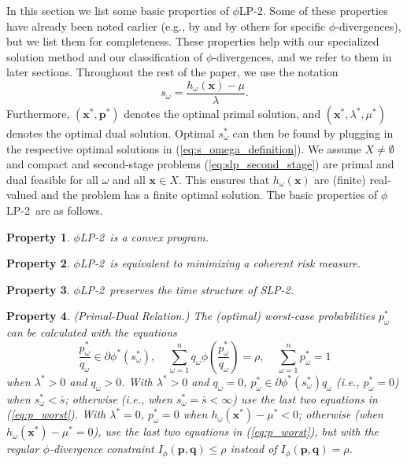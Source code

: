 \documentclass[opre,nonblindrev]{informs3} %
\newcommand{\x}{\mathbf{x}}
\newcommand{\q}{\mathbf{q}}
\newcommand{\p}{\mathbf{p}}
\newtheorem{property}{Property}
\newcommand{\plp}{$\phi$LP-2}
\begin{document}
In this section we list some basic properties of \plp.
Some of these properties have already been noted earlier (e.g., by \citet{bental2013robust} and by others for specific $\phi$-divergences), but we list them for completeness.
These properties help with our specialized solution method and our classification of $\phi$-divergences, and we refer to them in later sections.
Throughout the rest of the paper, we use the notation
\begin{equation}
	s_\omega = \frac{h_\omega(\x) - \mu}{\lambda}. \label{eq:s_omega_definition}
\end{equation}
Furthermore, $(\x^*, \p^*)$ denotes the optimal primal solution, and $(\x^*, \lambda^*, \mu^*)$ denotes the optimal dual solution.
Optimal $s_\omega^*$ can then be found by plugging in the respective optimal solutions in (\ref{eq:s_omega_definition}). 
We assume $X \neq \emptyset$ and compact and second-stage problems (\ref{eq:slp_second_stage}) are primal and dual feasible for all $\omega$ and all $\x \in X$. 
This ensures that $h_\omega(\x)$ are (finite) real-valued  and the problem has a finite optimal solution.  
The basic properties of \plp\ are as follows.


\begin{property}
	\label{property:convex}
	\plp\ is a convex program.
\end{property}

\begin{property}
	\label{property:coherent_risk_measure}
	\plp\ is equivalent to minimizing a coherent risk measure.
\end{property}

\begin{property}
	\label{property:time_structure}
	\plp\ preserves the time structure of SLP-2.
\end{property}

\begin{property} {\sc (Primal-Dual Relation.)}
	\label{property:primal_dual_relation}
	The (optimal) worst-case probabilities $p^*_\omega$ can be calculated with the equations
	\begin{equation}\label{eq:p_worst}
		\frac{p_\omega^*}{q_\omega} \in \partial \phi^*\left(s_\omega^*\right), \ \ \ \ \ \sum_{\omega=1}^n q_\omega \phi\left(\frac{p_\omega^*}{q_\omega}\right) = \rho, \ \ \ \ \ \sum_{\omega=1}^n p_\omega^* = 1
	\end{equation}		
when $\lambda^*>0$ and $q_\omega >0$. 
	With $\lambda^*>0$ and $q_\omega =0$, $p_\omega^* \in \partial \phi^*\left(s_\omega^*\right) q_\omega$ (i.e., $p_\omega^* = 0$) when $s_\omega^* < \bar{s}$; otherwise (i.e., when $s_\omega^* = \bar{s}<\infty$) use the last two equations in (\ref{eq:p_worst}). 
	With $\lambda^*=0$, $p_\omega^* = 0$ when $h_\omega(\x^*) - \mu^* < 0$; otherwise (when $h_\omega(\x^*) - \mu^* = 0$), use the last two equations in (\ref{eq:p_worst}), but with the regular $\phi$-divergence constraint $I_{\phi}(\p,\q)\leq \rho$ instead of $I_{\phi}(\p,\q)=\rho$. 
%
\end{property}
\end{document}

